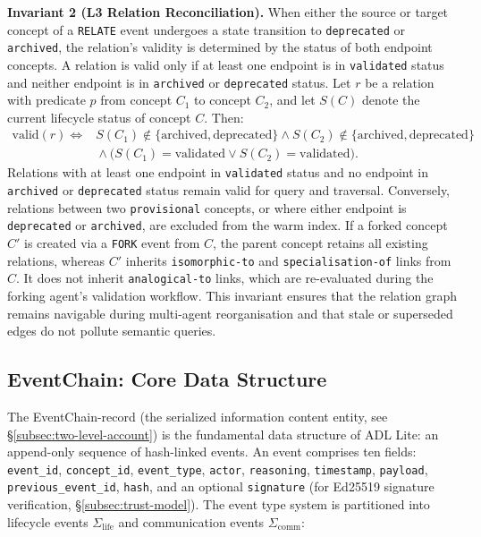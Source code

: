 \textbf{Invariant 2 (L3 Relation Reconciliation).} When either the source or target concept of a \texttt{RELATE} event undergoes a state transition to \texttt{deprecated} or \texttt{archived}, the relation's validity is determined by the status of both endpoint concepts. A relation is valid only if at least one endpoint is in \texttt{validated} status and neither endpoint is in \texttt{archived} or \texttt{deprecated} status. Let $r$ be a relation with predicate $p$ from concept $C_1$ to concept $C_2$, and let $S(C)$ denote the current lifecycle status of concept $C$. Then:
\begin{align}
    \text{valid}(r) \iff{}& S(C_1) \notin \{\text{archived}, \text{deprecated}\} \land S(C_2) \notin \{\text{archived}, \text{deprecated}\} \nonumber \\
    &{}\land \bigl(S(C_1) = \text{validated} \lor S(C_2) = \text{validated}\bigr).
\end{align}
Relations with at least one endpoint in \texttt{validated} status and no endpoint in \texttt{archived} or \texttt{deprecated} status remain valid for query and traversal. Conversely, relations between two \texttt{provisional} concepts, or where either endpoint is \texttt{deprecated} or \texttt{archived}, are excluded from the warm index. If a forked concept $C'$ is created via a \texttt{FORK} event from $C$, the parent concept retains all existing relations, whereas $C'$ inherits \texttt{isomorphic-to} and \texttt{specialisation-of} links from $C$. It does not inherit \texttt{analogical-to} links, which are re-evaluated during the forking agent's validation workflow. This invariant ensures that the relation graph remains navigable during multi-agent reorganisation and that stale or superseded edges do not pollute semantic queries.

\subsection{EventChain: Core Data Structure}\label{subsec:eventchain}

The EventChain-record (the serialized information content entity, see \S\ref{subsec:two-level-account}) is the fundamental data structure of ADL Lite: an append-only sequence of hash-linked events. An event comprises ten fields: \texttt{event\_id}, \texttt{concept\_id}, \texttt{event\_type}, \texttt{actor}, \texttt{reasoning}, \texttt{timestamp}, \texttt{payload}, \texttt{previous\_event\_id}, \texttt{hash}, and an optional \texttt{signature} (for Ed25519 signature verification, \S\ref{subsec:trust-model}). The event type system is partitioned into lifecycle events $\Sigma_{\text{life}}$ and communication events $\Sigma_{\text{comm}}$:

